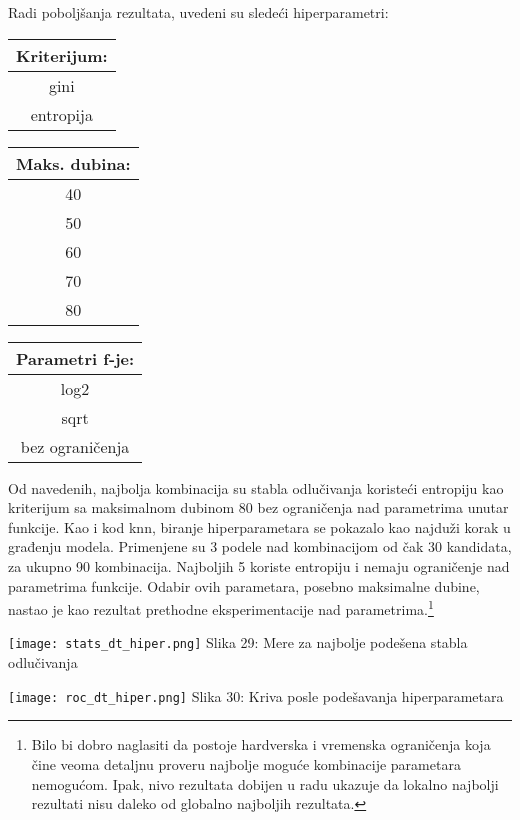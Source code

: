 \documentclass[a4paper]{article}
\begin{document}
{Radi poboljšanja rezultata, uvedeni su sledeći hiperparametri:

\begin{center}
\hphantom{aaaaaaaaaa}
\begin{tabular}{|c|} \hline
Kriterijum:\\ \hline \hline
gini\\ \hline
entropija\\ \hline
\end{tabular}
\hphantom{aaa}
\begin{tabular}{|c|} \hline
Maks. dubina:\\ \hline \hline
40\\ \hline
50\\ \hline
60\\ \hline
70\\ \hline
80\\ \hline
\end{tabular}
\hphantom{aaa}
\begin{tabular}{|c|} \hline
Parametri f-je:\\ \hline \hline
log2\\ \hline
sqrt\\ \hline
bez ograničenja\\ \hline
\end{tabular}
\end{center}

Od navedenih, najbolja kombinacija su stabla odlučivanja koristeći entropiju kao kriterijum sa maksimalnom dubinom 80 bez ograničenja nad parametrima unutar funkcije. Kao i kod knn, biranje hiperparametara se pokazalo kao najduži korak u građenju modela. Primenjene su 3 podele nad kombinacijom od čak 30 kandidata, za ukupno 90 kombinacija. Najboljih 5 koriste entropiju i nemaju ograničenje nad parametrima funkcije. Odabir ovih parametara, posebno maksimalne dubine, nastao je kao rezultat prethodne eksperimentacije nad parametrima.\footnote[3]{Bilo bi dobro naglasiti da postoje hardverska i vremenska ograničenja koja čine veoma detaljnu proveru najbolje moguće kombinacije parametara nemogućom. Ipak, nivo rezultata dobijen u radu ukazuje da lokalno najbolji rezultati nisu daleko od globalno najboljih rezultata.}

\noindent\begin{minipage}{0.4\textwidth}
\texttt{[image: stats\_dt\_hiper.png]}
Slika 29: Mere za najbolje podešena stabla odlučivanja\\
\end{minipage}
\begin{minipage}{0.6\textwidth}
\texttt{[image: roc\_dt\_hiper.png]}
\hphantom{aa}Slika 30: Kriva posle podešavanja hiperparametara\\
\end{minipage}

}
\end{document}
